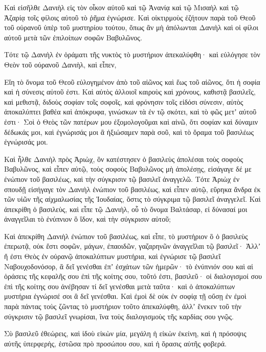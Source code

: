 {Καὶ εἰσῆλθε Δανιὴλ εἰς τὸν οἶκον αὐτοῦ καὶ τῷ Ἀνανίᾳ καὶ τῷ Μισαὴλ καὶ τῷ Ἀζαρίᾳ τοῖς φίλοις αὐτοῦ τὸ ῥῆμα ἐγνώρισε.
Καὶ οἰκτιρμοὺς ἐζήτουν παρὰ τοῦ Θεοῦ τοῦ οὐρανοῦ ὑπὲρ τοῦ μυστηρίου τούτου, ὅπως ἂν μὴ ἀπόλωνται Δανιὴλ καὶ οἱ φίλοι αὐτοῦ μετὰ τῶν ἐπιλοίπων σοφῶν Βαβυλῶνος.
\par }{\PP {}Τότε τῷ Δανιὴλ ἐν ὁράματι τῆς νυκτὸς τὸ μυστήριον ἀπεκαλύφθη· καὶ εὐλόγησε τὸν Θεὸν τοῦ οὐρανοῦ Δανιὴλ, καὶ εἶπεν,
\par }{\PP {}Εἴη τὸ ὄνομα τοῦ Θεοῦ εὐλογημένον ἀπὸ τοῦ αἰῶνος καὶ ἕως τοῦ αἰῶνος, ὅτι ἡ σοφία καὶ ἡ σύνεσις αὐτοῦ ἐστι.
Καὶ αὐτὸς ἀλλοιοῖ καιροὺς καὶ χρόνους, καθιστᾷ βασιλεῖς, καὶ μεθιστᾷ, διδοὺς σοφίαν τοῖς σοφοῖς, καὶ φρόνησιν τοῖς εἰδόσι σύνεσιν,
αὐτὸς ἀποκαλύπτει βαθέα καὶ ἀπόκρυφα, γινώσκων τὰ ἐν τῷ σκότει, καὶ τὸ φῶς μετʼ αὐτοῦ ἐστι·
Σοὶ ὁ Θεὸς τῶν πατέρων μου ἐξομολογοῦμαι καὶ αἰνῶ, ὅτι σοφίαν καὶ δύναμιν δέδωκάς μοι, καὶ ἐγνώρισάς μοι ἃ ἠξιώσαμεν παρὰ σοῦ, καὶ τὸ ὅραμα τοῦ βασιλέως ἐγνώρισάς μοι.
\par }{\PP {}Καὶ ἦλθε Δανιὴλ πρὸς Ἀριὼχ, ὃν κατέστησεν ὁ βασιλεὺς ἀπολέσαι τοὺς σοφοὺς Βαβυλῶνος, καὶ εἶπεν αὐτῷ, τοὺς σοφοὺς Βαβυλῶνος μὴ ἀπολέσῃς, εἰσάγαγε δέ με ἐνώπιον τοῦ βασιλέως, καὶ τὴν σύγκρισιν τῷ βασιλεῖ ἀναγγελῶ.
Τότε Ἀριὼχ ἐν σπουδῇ εἰσήγαγε τὸν Δανιὴλ ἐνώπιον τοῦ βασιλέως, καὶ εἶπεν αὐτῷ, εὕρηκα ἄνδρα ἐκ τῶν υἱῶν τῆς αἰχμαλωσίας τῆς Ἰουδαίας, ὅστις τὸ σύγκριμα τῷ βασιλεῖ ἀναγγελεῖ.
Καὶ ἀπεκρίθη ὁ βασιλεὺς, καὶ εἶπε τῷ Δανιὴλ, οὗ τὸ ὄνομα Βαλτάσαρ, εἰ δύνασαί μοι ἀναγγεῖλαι τὸ ἐνύπνιον ὃ ἴδον, καὶ τὴν σύγκρισιν αὐτοῦ;
\par }{\PP {}Καὶ ἀπεκρίθη Δανιὴλ ἐνώπιον τοῦ βασιλέως, καὶ εἶπε, τὸ μυστήριον ὃ ὁ βασιλεὺς ἐπερωτᾷ, οὐκ ἔστι σοφῶν, μάγων, ἐπαοιδῶν, γαζαρηνῶν ἀναγγεῖλαι τῷ βασιλεῖ·
Ἀλλʼ ἤ ἐστι Θεὸς ἐν οὐρανῷ ἀποκαλύπτων μυστήρια, καὶ ἐγνώρισε τῷ βασιλεῖ Ναβουχοδονόσορ, ἃ δεῖ γενέσθαι ἐπʼ ἐσχάτων τῶν ἡμερῶν· τὸ ἐνύπνιόν σου καὶ αἱ ὁράσεις τῆς κεφαλῆς σου ἐπὶ τῆς κοίτης σου, τοῦτό ἐστι,
βασιλεῦ· οἱ διαλογισμοί σου ἐπὶ τῆς κοίτης σου ἀνέβησαν τί δεῖ γενέσθαι μετὰ ταῦτα· καὶ ὁ ἀποκαλύπτων μυστήρια ἐγνώρισέ σοι ἃ δεῖ γενέσθαι.
Καὶ ἐμοὶ δὲ οὐκ ἐν σοφίᾳ τῇ οὔσῃ ἐν ἐμοὶ παρὰ πάντας τοὺς ζῶντας τὸ μυστήριον τοῦτο ἀπεκαλύφθη, ἀλλʼ ἕνεκεν τοῦ τὴν σύγκρισιν τῷ βασιλεῖ γνωρίσαι, ἵνα τοὺς διαλογισμοὺς τῆς καρδίας σου γνῷς.
\par }{\PP {}Σὺ βασιλεῦ ἐθεώρεις, καὶ ἰδοὺ εἰκὼν μία, μεγάλη ἡ εἰκὼν ἐκείνη, καὶ ἡ πρόσοψις αὐτῆς ὑπερφερὴς, ἑστῶσα πρὸ προσώπου σου, καὶ ἡ ὅρασις αὐτῆς φοβερά.
}
